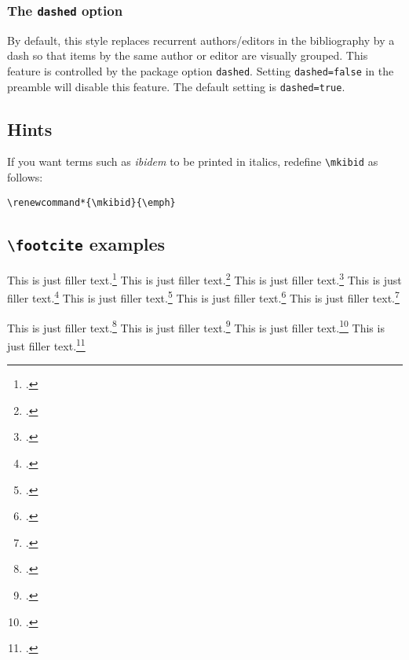 \documentclass[a4paper]{article}
\newcommand{\cmd}[1]{\texttt{\textbackslash #1}}
\begin{document}
\subsubsection*{The \texttt{dashed} option}

By default, this style replaces recurrent authors/editors in the
bibliography by a dash so that items by the same author or editor
are visually grouped. This feature is controlled by the package
option \texttt{dashed}. Setting \texttt{dashed=false} in the
preamble will disable this feature. The default setting is
\texttt{dashed=true}.

\subsection*{Hints}

If you want terms such as \emph{ibidem} to be printed in italics,
redefine \cmd{mkibid} as follows:

\begin{verbatim}
\renewcommand*{\mkibid}{\emph}
\end{verbatim}

\clearpage

\subsection*{\cmd{footcite} examples}

This is just filler text.\footcite{aristotle:anima}
This is just filler text.\footcite{aristotle:physics}
This is just filler text.\footcite{aristotle:anima}
This is just filler text.\footcite{aristotle:physics}
This is just filler text.\footcite{aristotle:physics}
\clearpage
This is just filler text.\footcite{aristotle:physics}
This is just filler text.\footcite{aristotle:physics}

\clearpage

This is just filler text.\footcite{kant:kpv}
This is just filler text.\footcite{kant:ku}
This is just filler text.\footcite[24]{kant:kpv}
This is just filler text.\footcite[59--63]{kant:ku}
\end{document}

